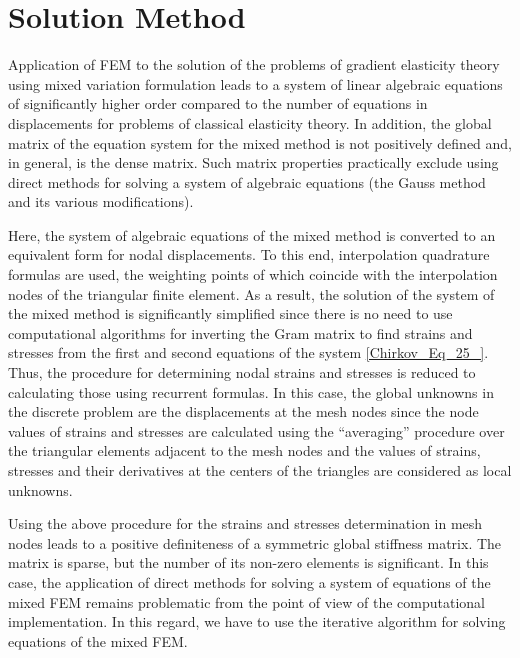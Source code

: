 \section{Solution Method}

Application of FEM to the solution of the problems of gradient elasticity theory using mixed variation formulation leads to a system of linear algebraic equations of significantly higher order compared to the number of equations in displacements for problems of classical elasticity theory. In addition, the global matrix of the equation system for the mixed method is not positively defined and, in general, is the dense matrix. Such matrix properties practically exclude using direct methods for solving a system of algebraic equations (the Gauss method and its various modifications).

Here, the system of algebraic equations of the mixed method is converted to an equivalent form for nodal displacements. To this end, interpolation quadrature formulas are used, the weighting points of which coincide with the interpolation nodes of the triangular finite element. As a result, the solution of the system of the mixed method is significantly simplified since there is no need to use computational algorithms for inverting the Gram matrix to find strains and stresses from the first and second equations of the system \eqref{Chirkov_Eq_25_}. Thus, the procedure for determining nodal strains and stresses is reduced to calculating those using recurrent formulas. In this case, the global unknowns in the discrete problem are the displacements at the mesh nodes since the node values of strains and stresses are calculated using the ``averaging'' procedure over the triangular elements adjacent to the mesh nodes and the values of strains, stresses and their derivatives at the centers of the triangles are considered as local unknowns.

Using the above procedure for the strains and stresses determination in mesh nodes leads to a positive definiteness of a symmetric global stiffness matrix. The matrix is sparse, but the number of its non-zero elements is significant. In this case, the application of direct methods for solving a system of equations of the mixed FEM remains problematic from the point of view of the computational implementation. In this regard, we have to use the iterative algorithm for solving equations of the mixed FEM.

